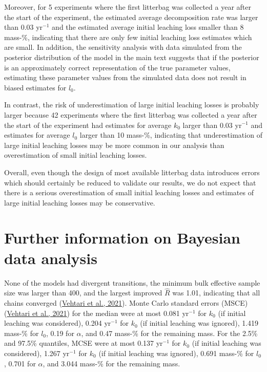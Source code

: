 \documentclass[
  12pt,
]{article}
\begin{document}
Moreover, for 5 experiments where the first litterbag was collected a year after the start of the experiment, the estimated average decomposition rate was larger than 0.03 yr\(^{-1}\) and the estimated average initial leaching loss smaller than 8 mass-\%, indicating that there are only few initial leaching loss estimates which are small. In addition, the sensitivity analysis with data simulated from the posterior distribution of the model in the main text suggests that if the posterior is an approximately correct representation of the true parameter values, estimating these parameter values from the simulated data does not result in biased estimates for \(l_0\).

In contrast, the risk of underestimation of large initial leaching losses is probably larger because 42 experiments where the first litterbag was collected a year after the start of the experiment had estimates for average \(k_0\) larger than 0.03 yr\(^{-1}\) and estimates for average \(l_0\) larger than 10 mass-\%, indicating that underestimation of large initial leaching losses may be more common in our analysis than overestimation of small initial leaching losses.

Overall, even though the design of most available litterbag data introduces errors which should certainly be reduced to validate our results, we do not expect that there is a serious overestimation of small initial leaching losses and estimates of large initial leaching losses may be conservative.

\hypertarget{sup-14}{%
\section{Further information on Bayesian data analysis}\label{sup-14}}

None of the models had divergent transitions, the minimum bulk effective sample size was larger than 400, and the largest improved \(\hat{R}\) was 1.01, indicating that all chains converged (\protect\hyperlink{ref-Vehtari.2021}{Vehtari et al., 2021}). Monte Carlo standard errors (MSCE) (\protect\hyperlink{ref-Vehtari.2021}{Vehtari et al., 2021}) for the median were at most 0.081 yr\(^{-1}\) for \(k_0\) (if initial leaching was considered), 0.204 yr\(^{-1}\) for \(k_0\) (if initial leaching was ignored), 1.419 mass-\% for \(l_0\), 0.19 for \(\alpha\), and 0.47 mass-\% for the remaining mass. For the 2.5\% and 97.5\% quantiles, MCSE were at most 0.137 yr\(^{-1}\) for \(k_0\) (if initial leaching was considered), 1.267 yr\(^{-1}\) for \(k_0\) (if initial leaching was ignored), 0.691 mass-\% for \(l_0\), 0.701 for \(\alpha\), and 3.044 mass-\% for the remaining mass.
\end{document}
